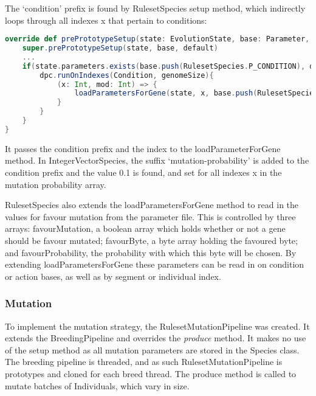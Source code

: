 The `{\ttfamily condition}' prefix is found by RulesetSpecies setup method, which indirectly loops through all indexes {\ttfamily x} that pertain to conditions:

\begin{minipage}{0.9\linewidth}
\centering
\begin{lstlisting}[language=scala]
override def prePrototypeSetup(state: EvolutionState, base: Parameter, default: Parameter): Unit = {
    super.prePrototypeSetup(state, base, default)
    ...
    if(state.parameters.exists(base.push(RulesetSpecies.P_CONDITION), default.push(RulesetSpecies.P_CONDITION))) {
        dpc.runOnIndexes(Condition, genomeSize){
            (x: Int, mod: Int) => {
                loadParametersForGene(state, x, base.push(RulesetSpecies.P_CONDITION), default.push(RulesetSpecies.P_CONDITION), "")
            }
        }
    }
}
\end{lstlisting}
\end{minipage}

It passes the condition prefix and the index to the loadParameterForGene method. In IntegerVectorSpecies, the suffix `{\ttfamily mutation-probability}' is added to the condition prefix and the value 0.1 is found, and set for all indexes {\ttfamily x} in the mutation probability array.

\vspace{\baselineskip}

RulesetSpecies also extends the loadParametersForGene method to read in the values for favour mutation from the parameter file. This is controlled by three arrays: favourMutation, a boolean array which holds whether or not a gene should be favour mutated; favourByte, a byte array holding the favoured byte; and favourProbability, the probability with which this byte will be chosen. By extending loadParametersForGene these parameters can be read in on condition or action bases, as well as by segment or individual index.


\subsubsection{Mutation}

To implement the mutation strategy, the RulesetMutationPipeline was created. It extends the BreedingPipeline and overrides the \emph{produce} method. It makes no use of the setup method as all mutation parameters are stored in the Species class. The breeding pipeline is threaded, and as such RulesetMutationPipeline is prototypes and cloned for each breed thread. The produce method is called to mutate batches of Individuals, which vary in size.

